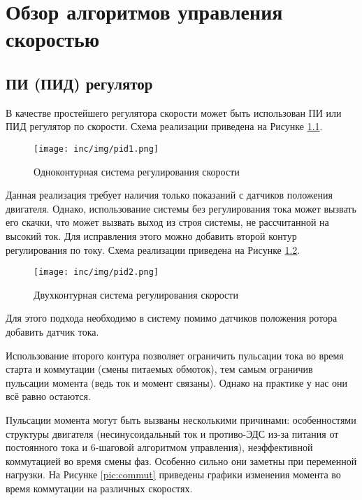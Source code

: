 \chapter{Обзор алгоритмов управления скоростью}
\label{cha:chap2}

\section{ПИ (ПИД) регулятор}
\label{sec:pid}

В качестве простейшего регулятора скорости может быть использован ПИ или ПИД регулятор по скорости. Схема реализации приведена на Рисунке \ref{pic:pid1}.

\begin{figure}[!h]
\centering
\texttt{[image: inc/img/pid1.png]}
\caption{Одноконтурная система регулирования скорости \cite{book.kim_motors}}
\label{pic:pid1}
\end{figure}

Данная реализация требует наличия только показаний с датчиков положения двигателя. Однако, использование системы без регулирования тока может вызвать его скачки, что может вызвать выход из строя системы, не рассчитанной на высокий ток. Для исправления этого можно добавить второй контур регулирования по току. Схема реализации приведена на Рисунке \ref{pic:pid2}.

\begin{figure}[!h]
\centering
\texttt{[image: inc/img/pid2.png]}
\caption{Двухконтурная система регулирования скорости \cite{book.kim_motors}}
\label{pic:pid2}
\end{figure}

Для этого подхода необходимо в систему помимо датчиков положения ротора добавить датчик тока.

Использование второго контура позволяет ограничить пульсации тока во время старта и коммутации (смены питаемых обмоток), тем самым ограничив пульсации момента (ведь ток и момент связаны). Однако на практике у нас они всё равно остаются. 

Пульсации момента могут быть вызваны несколькими причинами: особенностями структуры двигателя (несинусоидальный ток и противо-ЭДС из-за питания от постоянного тока и 6-шаговой алгоритмом управления), неэффективной коммутацией во время смены фаз. Особенно сильно они заметны при переменной нагрузки. На Рисунке \ref{pic:commut} приведены графики изменения момента во время коммутации на различных скоростях.

